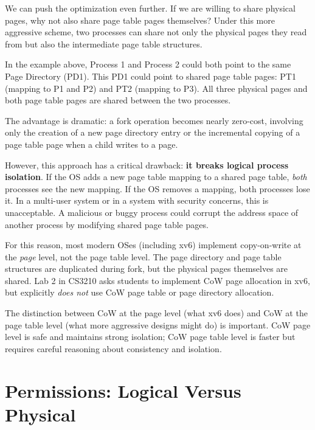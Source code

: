 \documentclass[11pt]{article}
\begin{document}
We can push the optimization even further. If we are willing to share physical pages, why not also share page table pages themselves? Under this more aggressive scheme, two processes can share not only the physical pages they read from but also the intermediate page table structures.

In the example above, Process 1 and Process 2 could both point to the same Page Directory (PD1). This PD1 could point to shared page table pages: PT1 (mapping to P1 and P2) and PT2 (mapping to P3). All three physical pages and both page table pages are shared between the two processes.

The advantage is dramatic: a fork operation becomes nearly zero-cost, involving only the creation of a new page directory entry or the incremental copying of a page table page when a child writes to a page.

However, this approach has a critical drawback: \textbf{it breaks logical process isolation}. If the OS adds a new page table mapping to a shared page table, \emph{both} processes see the new mapping. If the OS removes a mapping, both processes lose it. In a multi-user system or in a system with security concerns, this is unacceptable. A malicious or buggy process could corrupt the address space of another process by modifying shared page table pages.

For this reason, most modern OSes (including xv6) implement copy-on-write at the \emph{page} level, not the page table level. The page directory and page table structures are duplicated during fork, but the physical pages themselves are shared. Lab 2 in CS3210 asks students to implement CoW page allocation in xv6, but explicitly \emph{does not} use CoW page table or page directory allocation.

\begin{keytip}
The distinction between CoW at the page level (what xv6 does) and CoW at the page table level (what more aggressive designs might do) is important. CoW page level is safe and maintains strong isolation; CoW page table level is faster but requires careful reasoning about consistency and isolation.
\end{keytip}

\section{Permissions: Logical Versus Physical}
\end{document}
